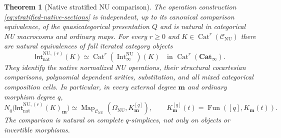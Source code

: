 \documentclass[oneside]{article}
\theoremstyle{plain}
\newtheorem{theorem}{Theorem}[section]
\theoremstyle{definition}
\theoremstyle{remark}
\newcommand{\CNU}{\mathcal C_{\mathrm{NU}}}
\newcommand{\Cat}{\mathbf{Cat}_{\infty}}
\newcommand{\Fun}{\operatorname{Fun}}
\newcommand{\Int}{\operatorname{Int}}
\newcommand{\Map}{\operatorname{Map}}
\newcommand{\NU}{\mathrm{NU}}
\begin{document}
\begin{theorem}[Native stratified NU comparison]
\label{thm:stratified-native-microcosm}
The operation construction
\eqref{eq:stratified-native-sections} is independent, up to its
canonical comparison equivalence, of the quasicategorical presentation
$Q$ and is natural in categorical NU macrocosms and ordinary maps.
For every $r\geq0$ and $K\in\operatorname{Cat}^r(\CNU)$ there are
natural equivalences of full iterated category objects
\begin{equation}\label{eq:stratified-native-microcosm}
 \mathsf{Int}^{\NU,(r)}_{\mathrm{nat}}(K)
 \simeq
 \operatorname{Cat}^r(\Int^{\NU}_\infty)(K)
 \quad\text{in }\operatorname{Cat}^r(\Cat).
\end{equation}
They identify the native normalized NU operations, their structural
cocartesian comparisons, polynomial dependent arities, substitution,
and all mixed categorical composition cells.  In particular, in every
external degree $\mathbf m$ and ordinary morphism degree $q$,
\begin{equation}\label{eq:stratified-native-cotensor}
 N_q\bigl(\mathsf{Int}^{\NU,(r)}_{\mathrm{nat}}(K)_{\mathbf m}\bigr)
 \simeq
 \Map_{\CNU}(\Omega_{\NU},K_{\mathbf m}^{[q]}),
 \qquad
 K_{\mathbf m}^{[q]}(t)=\Fun([q],K_{\mathbf m}(t)).
\end{equation}
The comparison is natural on complete $q$-simplices, not only on
objects or invertible morphisms.
\end{theorem}
\end{document}
